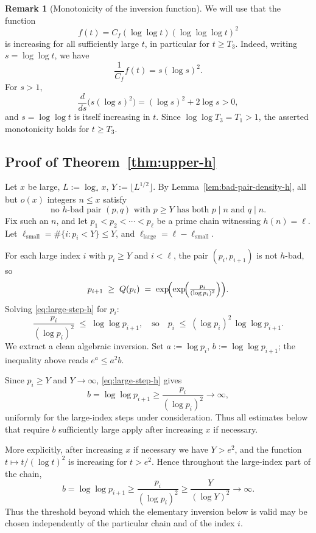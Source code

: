 \documentclass[11pt,reqno]{amsart}
\theoremstyle{plain}
\theoremstyle{definition}
\newtheorem{remark}[theorem]{Remark}
\newcommand{\logstar}{\log_{\!*}}
\begin{document}
\begin{remark}[Monotonicity of the inversion function]\label{rem:f-monotone}
We will use that the function
\[
f(t)=C_f(\log\log t)(\log\log\log t)^2
\]
is increasing for all sufficiently large $t$, in particular for $t\ge T_3$.
Indeed, writing $s=\log\log t$, we have
\[
\frac{1}{C_f}f(t)=s(\log s)^2.
\]
For $s>1$,
\[
\frac{d}{ds}\bigl(s(\log s)^2\bigr)
=
(\log s)^2+2\log s>0,
\]
and $s=\log\log t$ is itself increasing in $t$. Since
$\log\log T_3=T_1>1$, the asserted monotonicity holds for $t\ge T_3$.
\end{remark}

\subsection{Proof of Theorem~\ref{thm:upper-h}}

Let $x$ be large, $L:=\logstar x$, $Y:=\lfloor L^{1/2}\rfloor$. By
Lemma~\ref{lem:bad-pair-density-h}, all but $o(x)$ integers $n\le x$ satisfy
\begin{equation}\label{eq:no-h-bad}
\text{no $h$-bad pair $(p,q)$ with $p\ge Y$ has both $p\mid n$ and $q\mid n$}.
\tag{$\star_h$}
\end{equation}
Fix such an $n$, and let $p_1<p_2<\cdots<p_\ell$ be a prime chain witnessing
$h(n)=\ell$. Let $\ell_{\mathrm{small}}=\#\{i:p_i<Y\}\le Y$, and $\ell_{\mathrm{large}}=\ell-\ell_{\mathrm{small}}$.

For each large index $i$ with $p_i\ge Y$ and $i<\ell$, the pair $(p_i,p_{i+1})$ is
not $h$-bad, so
\begin{equation}\label{eq:large-step-h}
p_{i+1} \;\ge\; Q(p_i)
\;=\; \exp\!\Bigl(\exp\!\Bigl(\tfrac{p_i}{(\log p_i)^2}\Bigr)\Bigr).
\end{equation}
Solving \eqref{eq:large-step-h} for $p_i$:
\[
\frac{p_i}{(\log p_i)^2} \;\le\; \log\log p_{i+1},
\quad\text{so}\quad
p_i \;\le\; (\log p_i)^2\,\log\log p_{i+1}.
\]
We extract a clean algebraic inversion. Set $a:=\log p_i$, $b:=\log\log p_{i+1}$;
the inequality above reads $e^a\le a^2 b$.

Since $p_i\ge Y$ and $Y\to\infty$, \eqref{eq:large-step-h} gives
\[
   b=\log\log p_{i+1}\ge \frac{p_i}{(\log p_i)^2}\longrightarrow\infty,
\]
uniformly for the large-index steps under consideration. Thus all estimates
below that require $b$ sufficiently large apply after increasing $x$ if
necessary.

More explicitly, after increasing $x$ if necessary we have $Y>e^2$, and the
function $t\mapsto t/(\log t)^2$ is increasing for $t>e^2$. Hence throughout
the large-index part of the chain,
\[
   b=\log\log p_{i+1}
   \ge \frac{p_i}{(\log p_i)^2}
   \ge \frac{Y}{(\log Y)^2}
   \longrightarrow \infty .
\]
Thus the threshold beyond which the elementary inversion below is valid may be
chosen independently of the particular chain and of the index $i$.
\end{document}
